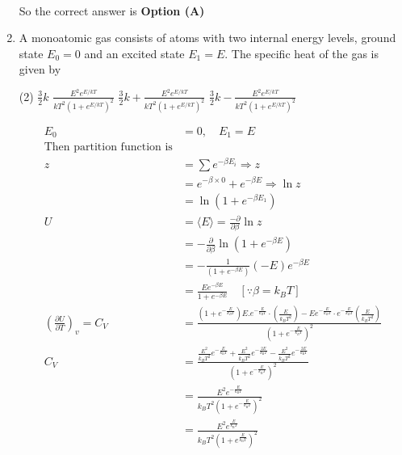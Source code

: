 \begin{enumerate}
\begin{answer}
\begin{align*}
		\end{align*}
		So the correct answer is \textbf{Option (A)}
	\end{answer}	
	\item  A monoatomic gas consists of atoms with two internal energy levels, ground state $E_{0}=0$ and an excited state $E_{1}=E$. The specific heat of the gas is given by
	{}
	\begin{tasks}(2)
		\task[\textbf{A.}] $\frac{3}{2} k$
		\task[\textbf{B.}] $\frac{E^{2} e^{E / k T}}{k T^{2}\left(1+e^{E / k T}\right)^{2}}$
		\task[\textbf{C.}] $\frac{3}{2} k+\frac{E^{2} e^{E / k T}}{k T^{2}\left(1+e^{E / k T}\right)^{2}}$
		\task[\textbf{D.}] $\frac{3}{2} k-\frac{E^{2} e^{E / k T}}{k T^{2}\left(1+e^{E / k T}\right)^{2}}$
	\end{tasks}
	\begin{answer}
		\begin{align*}
		E_{0}&=0, \quad E_{1}=E\\
		\text{Then partition function is}\\
		z&=\sum e^{-\beta E_{i}} \Rightarrow z\\&=e^{-\beta \times 0}+e^{-\beta E} \Rightarrow \ln z\\&=\ln \left(1+e^{-\beta E_{1}}\right)\\
		U&=\langle E\rangle=\frac{-\partial}{\partial \beta} \ln z\\&=-\frac{\partial}{\partial \beta} \ln \left(1+e^{-\beta E}\right)\\&=-\frac{1}{\left(1+e^{-\beta E}\right)}(-E) e^{-\beta E}\\&=\frac{E e^{-\beta E}}{1+e^{-\beta E}} \quad\left[\because \beta=k_{B} T\right]\\
		\left(\frac{\partial U}{\partial T}\right)_{v}=C_{V}&=\frac{\left(1+e^{-\frac{E}{k_{B} T}}\right) E . e^{-\frac{E}{k_{B} T}} \cdot\left(\frac{E}{k_{B} T^{2}}\right)-E e^{-\frac{E}{k_{B} T}} \cdot e^{-\frac{E}{k_{B} T}}\left(\frac{E}{k_{B} T^{2}}\right)}{\left(1+e^{-\frac{E}{k_{B} T}}\right)^{2}}\\
		C_{V}&=\frac{\frac{E^{2}}{k_{B} T^{2}} e^{-\frac{E}{k_{\mathrm{B}} T}}+\frac{E^{2}}{k_{B} T^{2}} e^{-\frac{2 E}{k_{\mathrm{B}} T}}-\frac{E^{2}}{k_{B} T^{2}} e^{-\frac{2 E}{k_{\mathrm{B}} T}}}{\left(1+e^{-\frac{E}{k_{\mathrm{B}} T}}\right)^{2}}\\&=\frac{E^{2} e^{-\frac{E}{k_{\mathrm{B}} T}}}{k_{B} T^{2}\left(1+e^{-\frac{E}{k_{\mathrm{B}} T}}\right)^{2}}\\&=\frac{E^{2} e^{\frac{E}{k_{\mathrm{B}} T}}}{k_{B} T^{2}\left(1+e^{\frac{E}{k_{\mathrm{B}} T}}\right)^{2}}\\

\end{align*}
\end{answer}
\end{enumerate}
